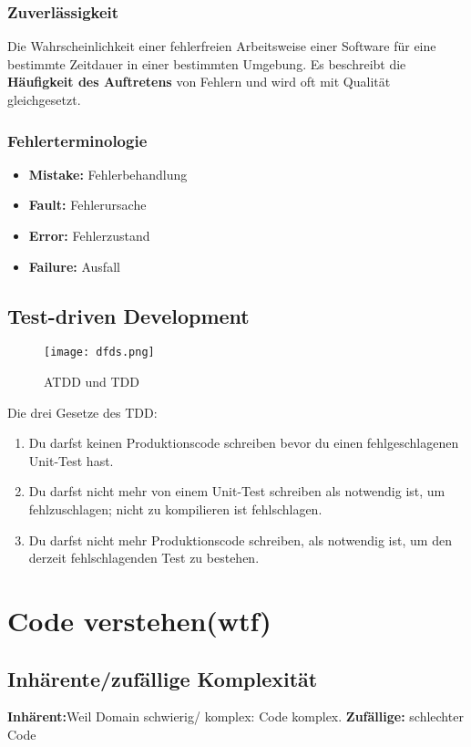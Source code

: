 \documentclass{book}
\begin{document}
    \subsection{Zuverlässigkeit}
    Die Wahrscheinlichkeit einer fehlerfreien Arbeitsweise einer Software für eine bestimmte
    Zeitdauer in einer bestimmten Umgebung. \newline Es beschreibt die \textbf{Häufigkeit des Auftretens} von Fehlern und wird
    oft mit Qualität gleichgesetzt.
    \subsection{Fehlerterminologie}
    \begin{itemize}
        \item \textbf{Mistake:} Fehlerbehandlung
        \item \textbf{Fault:} Fehlerursache
        \item \textbf{Error:} Fehlerzustand
        \item \textbf{Failure:} Ausfall
    \end{itemize}
    \section{Test-driven Development}
    \begin{figure}[H]
        \centering
        \texttt{[image: dfds.png]}
        \caption{ATDD und TDD}
        \label{fig:enter-label}
    \end{figure}
    Die drei Gesetze des TDD:
    \begin{enumerate}
        \item Du darfst keinen Produktionscode schreiben bevor du
        einen fehlgeschlagenen Unit-Test hast.
        \item Du darfst nicht mehr von einem Unit-Test schreiben als
        notwendig ist, um fehlzuschlagen; nicht zu kompilieren
        ist fehlschlagen.
        \item Du darfst nicht mehr Produktionscode schreiben, als
        notwendig ist, um den derzeit fehlschlagenden Test zu
        bestehen.
    \end{enumerate}
    \chapter{Code verstehen(wtf)}
    \section{Inhärente/zufällige Komplexität}
    \textbf{Inhärent:}Weil Domain schwierig/ komplex: Code komplex.
    \textbf{Zufällige:} schlechter Code
\end{document}
